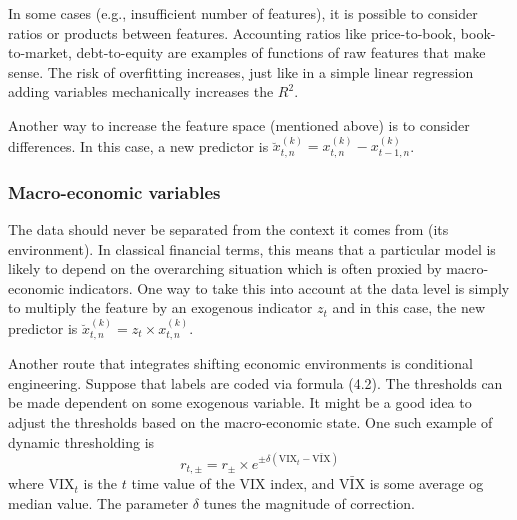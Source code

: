 In some cases (e.g., insufficient number of features), it is possible to consider ratios or products between features. Accounting ratios like price-to-book, book-to-market, debt-to-equity are examples of functions of raw features that make sense. The risk of overfitting increases, just like in a simple linear regression adding variables mechanically increases the $R^{2}$.

Another way to increase the feature space (mentioned above) is to consider differences. In this case, a new predictor is $\breve{x}_{t,n}^{(k)} = x_{t,n}^{(k)}  - x_{t-1,n}^{(k)}$.

\subsubsection{Macro-economic variables}
The data should never be separated from the context it comes from (its environment). In classical financial terms, this means that a particular model is likely to depend on the overarching situation which is often proxied by macro-economic indicators. One way to take this into account at the data level is simply to multiply the feature by an exogenous indicator $z_{t}$ and in this case, the new predictor is $\breve{x}_{t,n}^{(k)} = z_{t} \times x_{t,n}^{(k)}$.

Another route that integrates shifting economic environments is conditional engineering. Suppose that labels are coded via formula (4.2). The thresholds can be made dependent on some exogenous variable. It might be a good idea to adjust the thresholds based on the macro-economic state. One such example of dynamic thresholding is
\begin{equation}
    r_{t, \pm} = r_{\pm} \times e^{\pm \delta (\mathrm{VIX}_t - \bar{\mathrm{VIX}})}
\end{equation}
where $\mathrm{VIX}_{t}$ is the $t$ time value of the VIX index, and $\bar{\mathrm{VIX}}$ is some average og median value. The parameter $\delta $ tunes the magnitude of correction.